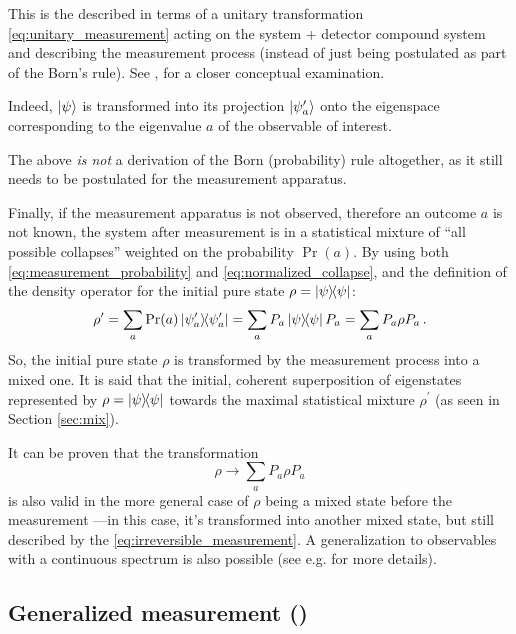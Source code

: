 This is the  described in terms of a unitary
transformation \eqref{eq:unitary_measurement}
acting on the system + detector compound system and describing
the measurement process
(instead of just being postulated as part of the Born's rule).
See \cite[sec. 2.5.4, \emph{Decoherence models versus Copenhagen interpretation}]{Haroche_Exploring},
for a closer conceptual examination.

Indeed,
$\ket{\psi}$
is transformed
into its projection $\ket{\psi^\prime_a}$
onto the eigenspace
corresponding to the eigenvalue $a$ of the observable of interest.

The above \emph{is not} a derivation of the Born (probability) rule altogether,
as it still needs to be postulated for the measurement apparatus.

Finally, if the measurement apparatus is not observed,
therefore an outcome $a$ is not known,
the system after measurement is in a statistical mixture
of ``all possible collapses'' weighted on the probability $\Pr(a)$.
By using both \eqref{eq:measurement_probability} and \eqref{eq:normalized_collapse},
and the definition of the density operator for the initial pure state
$\rho = \ketbra{\psi}$:
\[
  \rho^{\prime} = \sum_a \Pr(a) \ketbra{\psi^{\prime}_a} = \sum_a P_a \ketbra{\psi} P_a
    = \sum_a P_a \rho P_a \,\text{.}
\]
So, the initial pure state $\rho$ is transformed by the measurement process into a mixed one.
It is said that the initial, coherent superposition of eigenstates represented by $\rho = \ketbra{\psi}$
 towards the maximal statistical mixture $\rho^{\prime}$
(as seen in Section \ref{sec:mix}).

It can be proven that the transformation
\begin{equation}\label{eq:irreversible_measurement}
  \rho \rightarrow \sum_a P_a \rho P_a
\end{equation}
is also valid in the more general case of $\rho$ being a mixed state before the measurement
---in this case, it's transformed into another mixed state,
but still described by the \eqref{eq:irreversible_measurement}.
A generalization to observables with a continuous spectrum is also possible
(see e.g. \cite[Section 3.1.1]{PreskillNotes} for more details).


\subsection{Generalized measurement ()}
\label{subsec:POVM}

